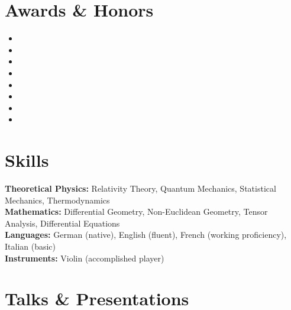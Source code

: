 \documentclass[letterpaper,11pt]{article}
\begin{document}

\section*{Awards \& Honors}

\begin{itemize}
    \item {}
    \item {}
    \item {}
    \item {}
    \item {}
    \item {}
    \item {}
    \item {}
\end{itemize}


\section*{Skills}

\textbf{Theoretical Physics:} Relativity Theory, Quantum Mechanics, Statistical Mechanics, Thermodynamics \\
\textbf{Mathematics:} Differential Geometry, Non-Euclidean Geometry, Tensor Analysis, Differential Equations \\
\textbf{Languages:} German (native), English (fluent), French (working proficiency), Italian (basic) \\
\textbf{Instruments:} Violin (accomplished player)


\section*{Talks \& Presentations}
\end{document}
